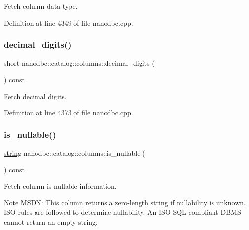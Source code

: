 Fetch column data type. 



Definition at line 4349 of file nanodbc.\+cpp.

\mbox{\label{classnanodbc_1_1catalog_1_1columns_ad22f3bf4453bc59bba45b7abbde93851}} 
\subsubsection{\texorpdfstring{decimal\_digits()}{decimal\_digits()}}
{\footnotesize\ttfamily short nanodbc\+::catalog\+::columns\+::decimal\+\_\+digits (\begin{DoxyParamCaption}{ }\end{DoxyParamCaption}) const}



Fetch decimal digits. 



Definition at line 4373 of file nanodbc.\+cpp.

\mbox{\label{classnanodbc_1_1catalog_1_1columns_aec69eacef15e7eae155f3267ebad1a78}} 
\subsubsection{\texorpdfstring{is\_nullable()}{is\_nullable()}}
{\footnotesize\ttfamily \mbox{\hyperlink{namespacenanodbc_abfc0ece56278e590911ec8352774c212}{string}} nanodbc\+::catalog\+::columns\+::is\+\_\+nullable (\begin{DoxyParamCaption}{ }\end{DoxyParamCaption}) const}



Fetch column is-\/nullable information. 

\begin{DoxyNote}{Note}
M\+S\+DN\+: This column returns a zero-\/length string if nullability is unknown. I\+SO rules are followed to determine nullability. An I\+SO S\+Q\+L-\/compliant D\+B\+MS cannot return an empty string. 
\end{DoxyNote}


